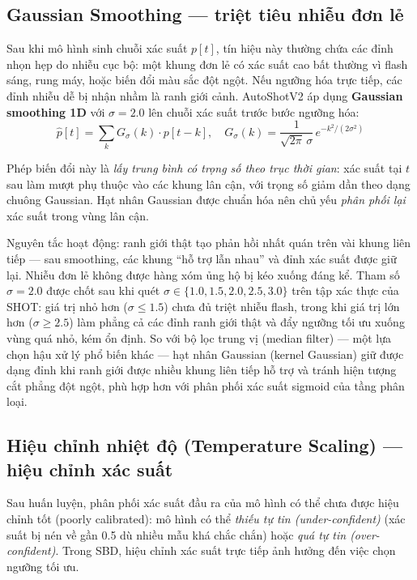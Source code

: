 \subsection{Gaussian Smoothing --- triệt tiêu nhiễu đơn lẻ}
\label{subsec:v2_gaussian}

Sau khi mô hình sinh chuỗi xác suất $p[t]$, tín hiệu này thường chứa các đỉnh nhọn hẹp do nhiễu cục bộ: một khung đơn lẻ có xác suất cao bất thường vì flash sáng, rung máy, hoặc biến đổi màu sắc đột ngột. Nếu ngưỡng hóa trực tiếp, các đỉnh nhiễu dễ bị nhận nhầm là ranh giới cảnh. AutoShotV2 áp dụng \textbf{Gaussian smoothing 1D} với $\sigma = 2.0$ lên chuỗi xác suất trước bước ngưỡng hóa:
\begin{equation}
    \hat{p}[t] = \sum_{k} G_\sigma(k)\cdot p[t-k], \quad G_\sigma(k) = \frac{1}{\sqrt{2\pi}\,\sigma}\,e^{-k^2/(2\sigma^2)}
    \label{eq:gaussian_smooth}
\end{equation}

Phép biến đổi này là \textit{lấy trung bình có trọng số theo trục thời gian}: xác suất tại $t$ sau làm mượt phụ thuộc vào các khung lân cận, với trọng số giảm dần theo dạng chuông Gaussian. Hạt nhân Gaussian được chuẩn hóa nên chủ yếu \textit{phân phối lại} xác suất trong vùng lân cận.

Nguyên tắc hoạt động: ranh giới thật tạo phản hồi nhất quán trên vài khung liên tiếp --- sau smoothing, các khung ``hỗ trợ lẫn nhau'' và đỉnh xác suất được giữ lại. Nhiễu đơn lẻ không được hàng xóm ủng hộ bị kéo xuống đáng kể. Tham số $\sigma = 2.0$ được chốt sau khi quét $\sigma \in \{1.0, 1.5, 2.0, 2.5, 3.0\}$ trên tập xác thực của SHOT: giá trị nhỏ hơn ($\sigma \le 1.5$) chưa đủ triệt nhiễu flash, trong khi giá trị lớn hơn ($\sigma \ge 2.5$) làm phẳng cả các đỉnh ranh giới thật và đẩy ngưỡng tối ưu xuống vùng quá nhỏ, kém ổn định. So với bộ lọc trung vị (median filter) --- một lựa chọn hậu xử lý phổ biến khác --- hạt nhân Gaussian (kernel Gaussian) giữ được dạng đỉnh khi ranh giới được nhiều khung liên tiếp hỗ trợ và tránh hiện tượng cắt phẳng đột ngột, phù hợp hơn với phân phối xác suất sigmoid của tầng phân loại.

\subsection{Hiệu chỉnh nhiệt độ (Temperature Scaling) --- hiệu chỉnh xác suất}
\label{subsec:v2_temperature}

Sau huấn luyện, phân phối xác suất đầu ra của mô hình có thể chưa được hiệu chỉnh tốt (poorly calibrated): mô hình có thể \textit{thiếu tự tin (under-confident)} (xác suất bị nén về gần 0.5 dù nhiều mẫu khá chắc chắn) hoặc \textit{quá tự tin (over-confident)}. Trong SBD, hiệu chỉnh xác suất trực tiếp ảnh hưởng đến việc chọn ngưỡng tối ưu.

